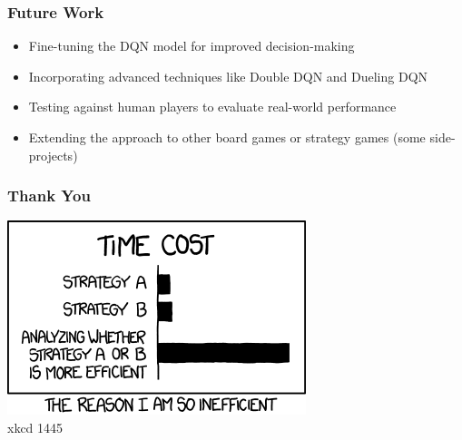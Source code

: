 \begin{frame}
	\frametitle{Future Work}
	\vspace{0.5cm}
	\begin{itemize}
		\item Fine-tuning the DQN model for improved decision-making
		\item Incorporating advanced techniques like Double DQN and Dueling DQN
		\item Testing against human players to evaluate real-world performance
		\item Extending the approach to other board games or strategy games (some side-projects)
	\end{itemize}
\end{frame}


\begin{frame}
	\frametitle{Thank You}
	\vspace{1cm}
	\centering
	\includegraphics{efficiency} \\
	xkcd 1445
\end{frame}






